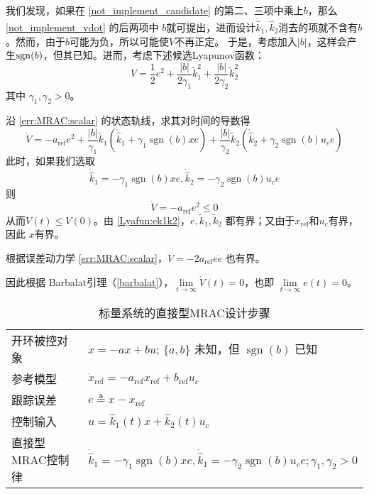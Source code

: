 我们发现，如果在 \eqref{not_implement_candidate} 的第二、三项中乘上$b$，那么 \eqref{not_implement_vdot} 的后两项中
$b$就可提出，进而设计$\dot{\hat{k}}_1,\dot{\hat{k}}_2$消去的项就不含有$b$。然而，由于$b$可能为负，所以可能使$V$不再正定。
于是，考虑加入$|b|$，这样会产生$\operatorname{sgn}(b)$，但其已知。进而，考虑下述候选Lyapunov函数：
\begin{equation}
  V = \frac{1}{2} e^2 + \frac{| b |}{2 \gamma_1} \tilde{k}^2_1 + \frac{| b
  |}{2 \gamma_2} \tilde{k}^2_2 \label{Lyafun:ek1k2}
\end{equation}
其中 $\gamma_1, \gamma_2 > 0$。

沿 \eqref{err:MRAC:scalar} 的状态轨线，求其对时间的导数得
\[ \dot{V} = - a_{\ensuremath{\operatorname{ref}}} e^2 + \frac{| b
   |}{\gamma_1} \widetilde{ k} _1 (\dot{\hat{k}}_1 + \gamma_1
   \ensuremath{\operatorname{sgn}} (b) x  e) + \frac{| b |}{\gamma_2}
   \tilde{k} _2 (\dot{\hat{k}}_2 + \gamma_2 \ensuremath{\operatorname{sgn}}
   (b)  u_c e) \]
此时，如果我们选取
\begin{equation}
  \dot{\hat{k}}_1 = -  \gamma_1 \ensuremath{\operatorname{sgn}} (b) x  e,
  \dot{\hat{k}}_2 = -  \gamma_2 \ensuremath{\operatorname{sgn}} (b)  u_c e
\end{equation}
则
\begin{equation*}
  \dot{V} = - a_{\ensuremath{\operatorname{ref}}} e^2 \leq 0
\end{equation*}
从而$V (t) \leq V (0)$。由 \eqref{Lyafun:ek1k2}，$e, \tilde{k} _1,
\tilde{k} _2$ 都有界；又由于$x_\mathrm{ref}$和$u_c$有界，因此 $x$有界。

根据误差动力学 \eqref{err:MRAC:scalar}，$\ddot{V} = - 2a_{\ensuremath{\operatorname{ref}}} e  \dot{e}$ 也有界。

因此根据 Barbalat引理（\ref{barbalat}），$\lim\limits_{t \rightarrow \infty}
\dot{V} (t) = 0$，也即 $\lim\limits_{t \rightarrow \infty} e (t) = 0$。

\begin{table}[h]
  \centering
  \setcellgapes{4pt}
  \makegapedcells
  \caption{标量系统的直接型MRAC设计步骤}
  \begin{tabular}{p{4.0cm}p{10.0cm}}
    \hline
    开环被控对象 & $\dot{x} = - a  x + b  u$; $\{ a, b \}$ 未知，但
    $\ensuremath{\operatorname{sgn}} (b)$ 已知\\
    参考模型 & $\dot{x}_{\ensuremath{\operatorname{ref}}} = -
    a_{\ensuremath{\operatorname{ref}}} x_{\ensuremath{\operatorname{ref}}} +
    b_{\ensuremath{\operatorname{ref}}} u_c$\\
    跟踪误差 & $e \triangleq x - x_{\ensuremath{\operatorname{ref}}}$\\
    控制输入 & $u = \hat{k}_1 (t) x + \hat{k}_2 (t) u_c$\\
    直接型MRAC控制律& $\dot{\hat{k}}_1 = -  \gamma_1
    \ensuremath{\operatorname{sgn}} (b) x  e, \dot{\hat{k}}_1 = -  \gamma_2
    \ensuremath{\operatorname{sgn}} (b)  u_c e ; \gamma_1, \gamma_2 > 0$\\
    \hline
  \end{tabular}
\end{table}

